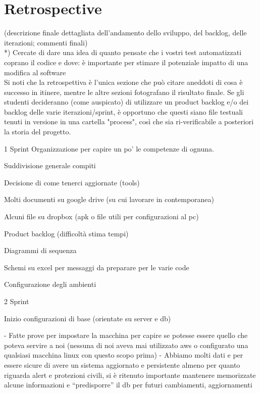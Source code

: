 \documentclass[a4paper,12pt]{report}
\begin{document}

\chapter{Retrospective}

(descrizione finale dettagliata dell'andamento dello sviluppo, del backlog, delle iterazioni; commenti finali)\\

*) Cercate di dare una idea di quanto pensate che i vostri test automatizzati coprano il codice e dove: è importante per stimare il potenziale impatto di una modifica al software\\


Si noti che la retrospettiva è l'unica sezione che può citare aneddoti di cosa è successo in itinere, mentre le altre sezioni fotografano il risultato finale. Se gli studenti decideranno (come auspicato) di utilizzare un product backlog e/o dei backlog delle varie iterazioni/sprint, è opportuno che questi siano file testuali tenuti in versione in una cartella "process", così che sia ri-verificabile a posteriori la storia del progetto.

1 Sprint
Organizzazione per capire un po’ le competenze di ognuna.

Suddivisione generale compiti 

Decisione di come tenerci aggiornate (tools)

Molti documenti su google drive (su cui lavorare in contemporanea)

Alcuni file su dropbox (apk o file utili per configurazioni al pc)

Product backlog (difficoltà stima tempi)

Diagrammi di sequenza 

Schemi su excel per messaggi da preparare per le varie code

Configurazione degli ambienti

2 Sprint 

Inizio configurazioni di base (orientate su server e db) 


-	Fatte prove per impostare la macchina per capire se potesse essere quello che poteva servire a noi (nessuna di noi aveva mai utilizzato aws o configurato una qualsiasi macchina linux con questo scopo prima)
-	Abbiamo molti dati e per essere sicure di avere un sistema aggiornato e persistente almeno per quanto riguarda alert e protezioni civili, si è ritenuto importante mantenere memorizzate alcune informazioni e “predisporre” il db per futuri cambiamenti, aggiornamenti
\end{document}
